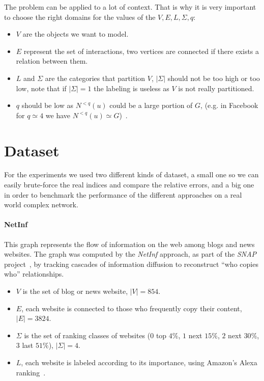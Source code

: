 The problem can be applied to a lot of context.
That is why it is very important to choose the right domains for the values of the $V, E, L, \Sigma, q$:
\begin{itemize}
	\item $V$ are the objects we want to model.
	\item $E$ represent the set of interactions, two vertices are connected if there exists a relation between them.
	\item $L$ and $\Sigma$ are the categories that partition $V$, $|\Sigma|$ should not be too high or too low, note that if $|\Sigma| = 1$ the labeling is useless as $V$ is not really partitioned.
	\item $q$ should be low as $N^{<q}(u)$ could be a large portion of $G$, (e.g. in Facebook for $q \simeq 4$ we have $N^{<q}(u) \simeq G$)~\cite{Facebook}.
\end{itemize}

\section{Dataset}

For the experiments we used two different kinds of dataset, a small one so we can easily brute-force the real indices and compare the relative errors, and a big one in order to benchmark the performance of the different approaches on a real world complex network.

\paragraph*{NetInf} This graph represents the flow of information on the web among blogs and news websites. The graph was computed by the \textit{NetInf} approach, as part of the \textit{SNAP} project~\cite{netinf}, by tracking cascades of information diffusion to reconstruct ``who copies who'' relationships.

\begin{itemize}
	\item $V$ is the set of blog or news website, $|V| = 854$.
	\item $E$, each website is connected to those who frequently copy their content, $|E| = 3824$.
	\item $\Sigma$ is the set of ranking classes of websites ($0$ top $4\%$, $1$ next $15\%$, $2$ next $30\%$, $3$ last $51\%$), $|\Sigma| = 4$.
	\item $L$, each website is labeled according to its importance, using Amazon's Alexa ranking~\cite{alexarank}.
\end{itemize}


